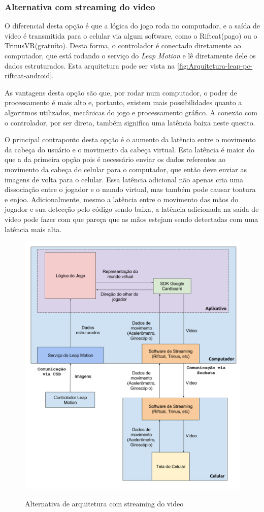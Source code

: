 \subsubsection{Alternativa com streaming do video}\label{subsubsec-arquiteturas-leapmotion-pc-riftcat-android}

O diferencial desta opção é que a lógica do jogo roda no computador, e a saída 
de vídeo é transmitida para o celular via algum software, como o Riftcat(pago) ou
o TrinusVR(gratuíto). Desta forma, o controlador é conectado diretamente 
ao computador, que está rodando o serviço do \textit{Leap Motion} e lê 
diretamente dele os dados estruturados. Esta arquitetura pode ser vista 
na \autoref{fig:Arquitetura-leap-pc-riftcat-android}.

As vantagens desta opção são que, por rodar num computador, o poder de 
processamento é mais alto e, portanto, existem mais possibilidades quanto
a algoritmos utilizados, mecânicas do jogo e processamento gráfico. A conexão 
com o controlador, por ser direta, também significa uma latência baixa 
neste quesito. 

O principal contraponto desta opção é o aumento da latência entre o movimento 
da cabeça do usuário e o movimento da cabeça virtual. Esta latência é maior do 
que a da primeira opção pois é necessário enviar os dados referentes ao movimento 
da cabeça do celular para o computador, que então deve enviar as imagens de 
volta para o celular. Essa latência adicional não apenas cria uma dissociação 
entre o jogador e o mundo virtual, mas também pode causar tontura e enjoo.
Adicionalmente, mesmo a latência entre o movimento das mãos do jogador e
sua detecção pelo código sendo baixa, a latência adicionada na saída de vídeo
pode fazer com que pareça que as mãos estejam sendo detectadas com uma latência 
mais alta.

\begin{figure}
	\centering
	\caption{Alternativa de arquitetura com streaming do video}
	\includegraphics[width=0.7\linewidth]{images/Arquitetura-leap-pc-riftcat-android}
	\legend{\fonteAP}
	\label{fig:Arquitetura-leap-pc-riftcat-android}
\end{figure}

